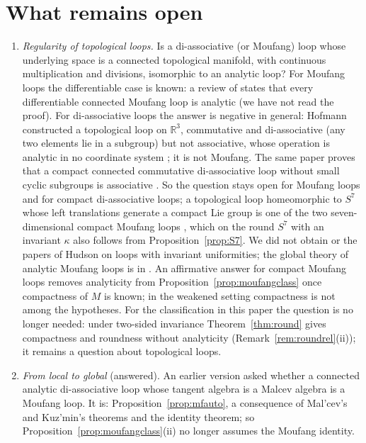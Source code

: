 \documentclass[11pt,reqno]{amsart}
\theoremstyle{definition}
\theoremstyle{remark}
\numberwithin{equation}{section}
\newcommand{\R}{\mathbb{R}}
\begin{document}
\section{What remains open}\label{sec:open}

\begin{enumerate}[label=\textbf{Q\arabic*.},leftmargin=2.6em]
\item \emph{Regularity of topological loops.}  Is a di-associative (or Moufang) loop whose underlying space is a connected
topological manifold, with continuous multiplication and divisions, isomorphic to an analytic loop?  For Moufang loops the differentiable case is known: a review of \cite{NS98} states that every differentiable connected
Moufang loop is analytic (we have not read the proof).  For di-associative loops the answer is negative in general: Hofmann
constructed a topological loop on $\R^3$, commutative and di-associative (any two elements lie in a subgroup) but not associative, whose
operation is analytic in no coordinate system \cite[(9.1)--(9.3)]{Hofmann58II}; it is not Moufang.  The same paper proves that a compact
connected commutative di-associative loop without small cyclic subgroups is associative \cite[(8.30)]{Hofmann58II}.  So the question
stays open for Moufang loops and for compact di-associative loops; a topological loop homeomorphic to $S^7$ whose left translations
generate a compact Lie group is one of the two seven-dimensional compact Moufang loops \cite[Thm.~6]{FS15}, which on the round $S^7$
with an invariant $\kappa$ also follows from Proposition~\ref{prop:S7}.  We did not obtain \cite{HS90} or the papers of Hudson on loops
with invariant uniformities; the global theory of analytic Moufang loops is in \cite{Kerdman,NS02}.  An affirmative answer for compact
Moufang loops removes analyticity from Proposition~\ref{prop:moufangclass} once compactness of $M$ is known; in the weakened setting
compactness is not among the hypotheses.  For the classification in this paper the question is no longer needed: under two-sided
invariance Theorem~\ref{thm:round} gives compactness and roundness without analyticity (Remark~\ref{rem:roundrel}(ii)); it remains a
question about topological loops.
\item \emph{From local to global} (answered).  An earlier version asked whether a connected analytic di-associative loop whose tangent
algebra is a Malcev algebra is a Moufang loop.  It is: Proposition~\ref{prop:mfauto}, a consequence of Mal'cev's and Kuz'min's
theorems and the identity theorem; so Proposition~\ref{prop:moufangclass}(ii) no longer assumes the Moufang identity.

\end{enumerate}
\end{document}
